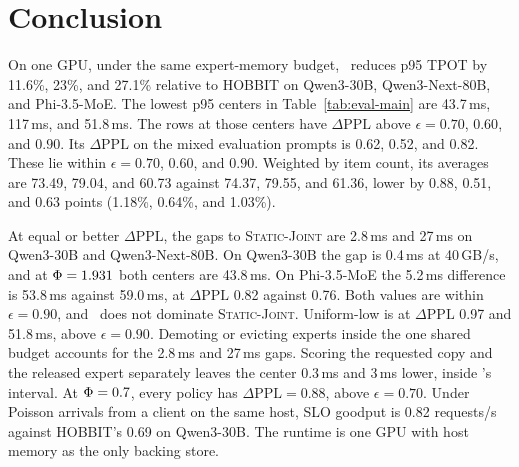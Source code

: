 \section{Conclusion}
\label{sec:conclusion}

On one GPU, under the same expert-memory budget, \systemname\ reduces p95 TPOT by 11.6\%, 23\%, and 27.1\% relative to HOBBIT on Qwen3-30B, Qwen3-Next-80B, and Phi-3.5-MoE.
The lowest p95 centers in Table~\ref{tab:eval-main} are 43.7\,ms, 117\,ms, and 51.8\,ms. The rows at those centers have \(\Delta\mathrm{PPL}\) above \(\epsilon=0.70\), \(0.60\), and \(0.90\).
Its \(\Delta\mathrm{PPL}\) on the mixed evaluation prompts is 0.62, 0.52, and 0.82. These lie within \(\epsilon=0.70\), \(0.60\), and \(0.90\).
Weighted by item count, its averages are 73.49, 79.04, and 60.73 against 74.37, 79.55, and 61.36, lower by 0.88, 0.51, and 0.63 points (1.18\%, 0.64\%, and 1.03\%).

At equal or better \(\Delta\mathrm{PPL}\), the gaps to \textsc{Static-Joint} are 2.8\,ms and 27\,ms on Qwen3-30B and Qwen3-Next-80B.
On Qwen3-30B the gap is 0.4\,ms at 40\,GB/s, and at \(\Phi=1.931\) both centers are 43.8\,ms.
On Phi-3.5-MoE the 5.2\,ms difference is 53.8\,ms against 59.0\,ms, at \(\Delta\mathrm{PPL}\) 0.82 against 0.76. Both values are within \(\epsilon=0.90\), and \systemname\ does not dominate \textsc{Static-Joint}. Uniform-low is at \(\Delta\mathrm{PPL}\) 0.97 and 51.8\,ms, above \(\epsilon=0.90\).
Demoting or evicting experts inside the one shared budget accounts for the 2.8\,ms and 27\,ms gaps.
Scoring the requested copy and the released expert separately leaves the center 0.3\,ms and 3\,ms lower, inside \systemname's interval.
At \(\Phi=0.7\), every policy has \(\Delta\mathrm{PPL}=0.88\), above \(\epsilon=0.70\).
Under Poisson arrivals from a client on the same host, SLO goodput is 0.82 requests/s against HOBBIT's 0.69 on Qwen3-30B.
The runtime is one GPU with host memory as the only backing store.
